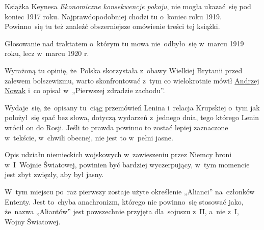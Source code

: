 \documentclass[a4paper,11pt]{article}
\begin{document}
\vspace{\spaceFour}



\start {} Książka Keynesa \textit{Ekonomiczne konsekwencje
  pokoju}, nie mogła ukazać~się pod koniec 1917 roku.
Najprawdopodobniej chodzi tu o~koniec roku 1919. Powinno~się tu też
znaleźć obszerniejsze omówienie treści tej książki.

\vspace{\spaceFour}



\start {} Głosowanie nad traktatem o~którym tu mowa
nie~odbyło~się w~marcu 1919 roku, lecz w~marcu 1920 r.

\vspace{\spaceFour}



\start {} Wyrażoną tu opinię, że~Polska skorzystała z~obawy
Wielkiej Brytanii przed zalewem bolszewizmu, warto skonfrontować z~tym
co wielokrotnie mówił
\href{https://www.youtube.com/watch?v=yfQ7rpq_irA}{Andrzej Nowak} i~co
opisał w~„Pierwszej zdradzie zachodu”.

\vspace{\spaceFour}



\start {} Wydaje~się, że~opisany tu~ciąg przemówień Lenina
i~relacja Krupskiej o~tym jak położył~się spać bez słowa, dotyczą
wydarzeń z~jednego dnia, tego którego Lenin wrócił on do Rosji. Jeśli
to prawda powinno to zostać lepiej zaznaczone w~tekście, w~chwili
obecnej, nie jest to w~pełni jasne.

\vspace{\spaceFour}



\start {} Opis udziału niemieckich wojskowych w~zawieszeniu
przez Niemcy broni w~I~Wojnie Światowej, powinien być bardziej
wyczerpujący, w~tym momencie jest zbyt zwięzły, aby był jasny.

\vspace{\spaceFour}



\start {} W~tym miejscu po~raz pierwszy zostaje użyte
określenie „Alianci” na~członków Ententy. Jest to~chyba anachronizm,
którego nie powinno~się stosować jako, że~nazwa „Aliantów” jest
powszechnie przyjęta dla~sojuszu z~II, a~nie z~I, Wojny Światowej.

\vspace{\spaceFour}
\end{document}
